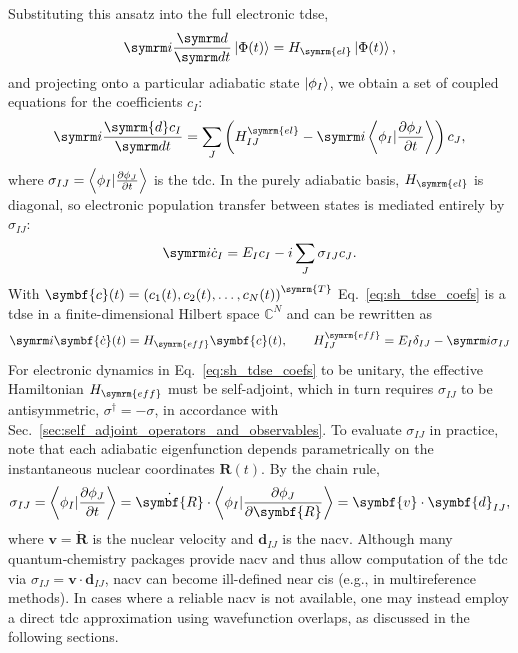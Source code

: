 Substituting this ansatz into the full electronic \gls{tdse},
\begin{equation}
\i\ddt\ket{\Phi(t)}=H_{\symrm{el}}\ket{\Phi(t)},
\end{equation}
and projecting onto a particular adiabatic state $\ket{\phi_I}$, we obtain a set of coupled equations for the coefficients $c_I$:
\begin{equation}\label{eq:tsh_eom}
\i\frac{\symrm{d}c_I}{\dt}=\sum_J\left(H_{IJ}^{\symrm{el}}-\i\Braket{\phi_I\vert\frac{\partial\phi_J}{\partial t}}\right)c_J,
\end{equation}
where $\sigma_{IJ}=\Braket{\phi_I\vert\frac{\partial\phi_J}{\partial t}}$ is the \gls{tdc}. In the purely adiabatic basis, $H_{\symrm{el}}$ is diagonal, so electronic population transfer between states is mediated entirely by $\sigma_{IJ}$:
\begin{equation}\label{eq:sh_tdse_coefs}
\i\dot c_I=E_I c_I-i\sum_J\sigma_{IJ}c_J.
\end{equation}
With $\symbf{c}(t)=\left(c_1(t),c_2(t),\dots,c_N(t)\right)^{\symrm{T}}$ Eq.~\eqref{eq:sh_tdse_coefs} is a \gls{tdse} in a finite-dimensional Hilbert space $\mathbb{C}^N$ and can be rewritten as
\begin{equation}
\i\symbf{\dot{c}}(t)=H_{\symrm{eff}}\symbf{c}(t),\qquad H_{IJ}^{\symrm{eff}}=E_I\delta_{IJ}-\i\sigma_{IJ}
\end{equation}
For electronic dynamics in Eq.~\eqref{eq:sh_tdse_coefs} to be unitary, the effective Hamiltonian $H_{\symrm{eff}}$ must be self-adjoint, which in turn requires $\sigma_{IJ}$ to be antisymmetric, $\sigma^\dagger=-\sigma$, in accordance with Sec.~\ref{sec:self_adjoint_operators_and_observables}. To evaluate $\sigma_{IJ}$ in practice, note that each adiabatic eigenfunction depends parametrically on the instantaneous nuclear coordinates $\symbf{R}(t)$. By the chain rule,
\begin{equation}\label{eq:tdc_nacv}
\sigma_{IJ}=\Braket{\phi_I\vert\frac{\partial\phi_J}{\partial t}}=\dot{\symbf{R}}\cdot\Braket{\phi_I\vert\frac{\partial\phi_J}{\partial\symbf{R}}}=\symbf{v}\cdot\symbf{d}_{IJ},
\end{equation}
where $\symbf{v}=\dot{\symbf{R}}$ is the nuclear velocity and $\symbf{d}_{IJ}$ is the \gls{nacv}. Although many quantum‐chemistry packages provide \gls{nacv} and thus allow computation of the \gls{tdc} via $\sigma_{IJ}=\symbf{v}\cdot\symbf{d}_{IJ}$, \gls{nacv} can become ill-defined near \glspl{ci} (e.g., in multireference methods). In cases where a reliable \gls{nacv} is not available, one may instead employ a direct \gls{tdc} approximation using wavefunction overlaps, as discussed in the following sections.
